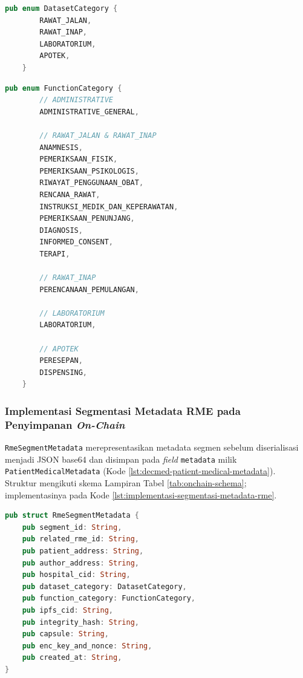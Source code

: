 \documentclass[bahasa, 12pt, a4paper, onecolumn, oneside, final]{report}
\begin{document}
\begin{lstlisting}[language=Rust, caption=Implementasi \texttt{DatasetCategory} pada \textit{crate} \texttt{decmed-rme-segment}, label={lst:implementasi-dataset-category-segmentasi-rme}]
	pub enum DatasetCategory {
		RAWAT_JALAN,
		RAWAT_INAP,
		LABORATORIUM,
		APOTEK,
	}
\end{lstlisting}

\begin{lstlisting}[language=Rust, caption=Implementasi \texttt{FunctionCategory} pada \textit{crate} \texttt{decmed-rme-segment}, label={lst:implementasi-function-category-segmentasi-rme}]
	pub enum FunctionCategory {
		// ADMINISTRATIVE
		ADMINISTRATIVE_GENERAL,
	
		// RAWAT_JALAN & RAWAT_INAP
		ANAMNESIS,
		PEMERIKSAAN_FISIK,
		PEMERIKSAAN_PSIKOLOGIS,
		RIWAYAT_PENGGUNAAN_OBAT,
		RENCANA_RAWAT,
		INSTRUKSI_MEDIK_DAN_KEPERAWATAN,
		PEMERIKSAAN_PENUNJANG,
		DIAGNOSIS,
		INFORMED_CONSENT,
		TERAPI,
	
		// RAWAT_INAP
		PERENCANAAN_PEMULANGAN,
	
		// LABORATORIUM
		LABORATORIUM,
	
		// APOTEK
		PERESEPAN,
		DISPENSING,
	}
\end{lstlisting}

\subsubsection{Implementasi Segmentasi Metadata RME pada Penyimpanan \textit{On-Chain}}
\label{subsec:implementasi-segmentasi-metadata-rme-onchain}

\texttt{RmeSegmentMetadata} merepresentasikan metadata segmen sebelum diserialisasi menjadi JSON base64 dan disimpan pada \textit{field} \texttt{metadata} milik \texttt{PatientMedicalMetadata} (Kode \ref{lst:decmed-patient-medical-metadata}). Struktur mengikuti skema Lampiran Tabel \ref{tab:onchain-schema}; implementasinya pada Kode \ref{lst:implementasi-segmentasi-metadata-rme}.

\begin{lstlisting}[language=Rust, caption=Implementasi struktur \texttt{RmeSegmentMetadata} pada \textit{crate} \texttt{decmed-rme-segment}, label={lst:implementasi-segmentasi-metadata-rme}]
pub struct RmeSegmentMetadata {
	pub segment_id: String,
	pub related_rme_id: String,
	pub patient_address: String,
	pub author_address: String,
	pub hospital_cid: String,
	pub dataset_category: DatasetCategory,
	pub function_category: FunctionCategory,
	pub ipfs_cid: String,
	pub integrity_hash: String,
	pub capsule: String,
	pub enc_key_and_nonce: String,
	pub created_at: String,
}
\end{lstlisting}
\end{document}
